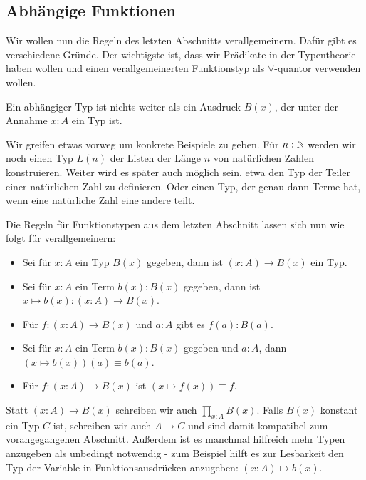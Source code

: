 \subsection{Abhängige Funktionen}
Wir wollen nun die Regeln des letzten Abschnitts verallgemeinern.
Dafür gibt es verschiedene Gründe. Der wichtigste ist, dass wir Prädikate in der Typentheorie haben wollen und einen verallgemeinerten Funktionstyp als $\forall$-quantor verwenden wollen.

Ein abhängiger Typ ist nichts weiter als ein Ausdruck $B(x)$, der unter der Annahme $x:A$ ein Typ ist.

\begin{beispiel}
  Wir greifen etwas vorweg um konkrete Beispiele zu geben.
  Für $n:\mathbb{N}$ werden wir noch einen Typ $L(n)$ der Listen der Länge $n$ von natürlichen Zahlen konstruieren. Weiter wird es später auch möglich sein, etwa den Typ der Teiler einer natürlichen Zahl zu definieren. Oder einen Typ, der genau dann Terme hat, wenn eine natürliche Zahl eine andere teilt.
\end{beispiel}

Die Regeln für Funktionstypen aus dem letzten Abschnitt lassen sich nun wie folgt für  verallgemeinern:

\begin{regeln}
\begin{itemize}
\item Sei für $x:A$ ein Typ $B(x)$ gegeben, dann ist $(x:A)\to B(x)$ ein Typ. 
\item Sei für $x:A$ ein Term $b(x):B(x)$ gegeben, dann ist $x\mapsto b(x) : (x:A)\to B(x)$. 
\item Für $f:(x:A)\to B(x)$ und $a:A$ gibt es $f(a):B(a)$. 
\item Sei für $x:A$ ein Term $b(x):B(x)$ gegeben und $a:A$, dann $(x\mapsto b(x))(a)\equiv b(a)$. 
\item Für $f:(x:A)\to B(x)$ ist $(x\mapsto f(x))\equiv f$.
\end{itemize}
\end{regeln}

Statt $(x:A)\to B(x)$ schreiben wir auch $\prod_{x:A}B(x)$.
Falls $B(x)$ konstant ein Typ $C$ ist, schreiben wir auch $A\to C$ und sind damit kompatibel zum vorangegangenen Abschnitt.
Außerdem ist es manchmal hilfreich mehr Typen anzugeben als unbedingt notwendig - zum Beispiel hilft es zur Lesbarkeit den Typ der Variable in Funktionsausdrücken anzugeben: $(x:A)\mapsto b(x)$.

